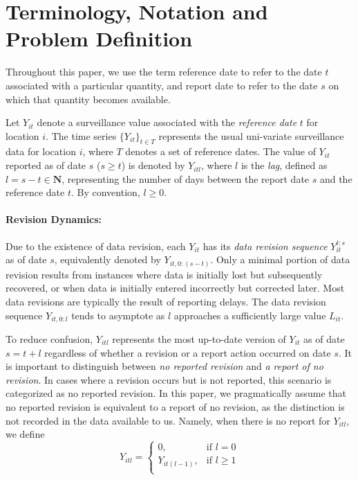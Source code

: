 \section{Terminology, Notation and Problem Definition}

Throughout this paper, we use the term reference date to refer to the date $t$ associated with a particular quantity, and report date to refer to the date $s$ on which that quantity becomes available.

Let $Y_{it}$ denote a surveillance value associated with the \emph{reference date} $t$ for location $i$. The time series $\{Y_{it}\}_{t \in T}$ represents the usual uni-variate surveillance data for location $i$, where $T$ denotes a set of reference dates. The value of $Y_{it}$ reported as of date $s$ ($s \ge t$) is denoted by $Y_{itl}$, where $l$ is the \emph{lag}, defined as $l = s - t \in \mathbf{N}$, representing the number of days between the report date $s$ and the reference date $t$. By convention, $l \ge 0$.

\paragraph{Revision Dynamics:} Due to the existence of data revision, each $Y_{it}$ has its \emph{data revision sequence} $Y_{it}^{t:s}$ as of date $s$, equivalently denoted by $Y_{it,0:(s-t)}$. Only a minimal portion of data revision results from instances where data is initially lost but subsequently recovered, or when data is initially entered incorrectly but corrected later. Most data revisions are typically the result of reporting delays. The data revision sequence $Y_{it,0:l}$ tends to asymptote as $l$ approaches a sufficiently large value $L_{it}$. 

To reduce confusion, $Y_{itl}$ represents the most up-to-date version of $Y_{it}$ as of date $s = t+l$ regardless of whether a revision or a report action occurred on date $s$. It is important to distinguish between \emph{no reported revision} and \emph{a report of no revision}. In cases where a revision occurs but is not reported, this scenario is categorized as no reported revision. In this paper, we pragmatically assume that no reported revision is equivalent to a report of no revision, as the distinction is not recorded in the data available to us. Namely, when there is no report for $Y_{itl}$, we define 
$$
    Y_{itl}=
\begin{cases}
    0,           & \text{if } l = 0\\
    Y_{it(l-1)}, & \text{if } l\geq 1\\    
\end{cases}
$$


